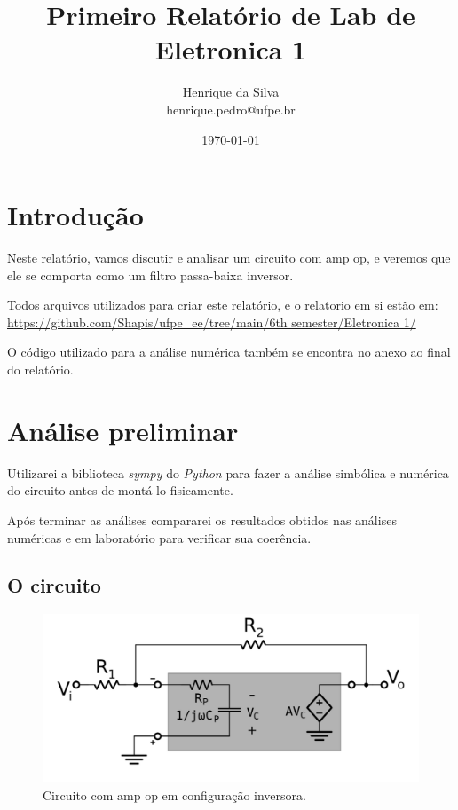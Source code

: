 \documentclass[12pt,twoside, a4paper, twocolumn]{article}
\title{Primeiro Relatório de Lab de Eletronica 1}
\author{Henrique da Silva \\ henrique.pedro@ufpe.br}
\date{\today}
\begin{document}
\maketitle
{}
\newpage
\tableofcontents
\newpage


\section{Introdução}


Neste relatório, vamos discutir e analisar um circuito com amp op, e veremos que ele se comporta como um filtro passa-baixa inversor.


Todos arquivos utilizados para criar este relatório, e o relatorio em si estão em:  \url{https://github.com/Shapis/ufpe_ee/tree/main/6th semester/Eletronica 1/}


O código utilizado para a análise numérica também se encontra no anexo ao final do relatório.


\section{Análise preliminar}


Utilizarei a biblioteca \emph{sympy} do \emph{Python} para fazer a análise simbólica e numérica do circuito antes de montá-lo fisicamente.


Após terminar as análises compararei os resultados obtidos nas análises numéricas e em laboratório para verificar sua coerência.


\subsection{O circuito}


\begin{figure}[h]
    \centering
    \includegraphics[width=1\columnwidth]{images/circuito.png}
    \caption{Circuito com amp op em configuração inversora.}
\end{figure}
\end{document}
